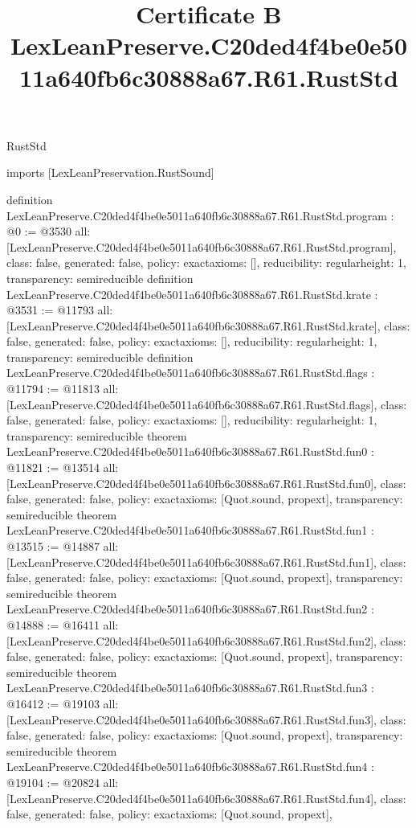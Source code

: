 \begin{lexlean}{RustStd}
\title{Certificate B LexLeanPreserve.C20ded4f4be0e5011a640fb6c30888a67.R61.RustStd}
\begin{coremodule}
imports [LexLeanPreservation.RustSound]

definition LexLeanPreserve.C20ded4f4be0e5011a640fb6c30888a67.R61.RustStd.program : @0 := @3530 {
  all: [LexLeanPreserve.C20ded4f4be0e5011a640fb6c30888a67.R61.RustStd.program],
  class: false,
  generated: false,
  policy: exact{axioms: []},
  reducibility: regular{height: 1},
  transparency: semireducible
}
definition LexLeanPreserve.C20ded4f4be0e5011a640fb6c30888a67.R61.RustStd.krate : @3531 := @11793 {
  all: [LexLeanPreserve.C20ded4f4be0e5011a640fb6c30888a67.R61.RustStd.krate],
  class: false,
  generated: false,
  policy: exact{axioms: []},
  reducibility: regular{height: 1},
  transparency: semireducible
}
definition LexLeanPreserve.C20ded4f4be0e5011a640fb6c30888a67.R61.RustStd.flags : @11794 := @11813 {
  all: [LexLeanPreserve.C20ded4f4be0e5011a640fb6c30888a67.R61.RustStd.flags],
  class: false,
  generated: false,
  policy: exact{axioms: []},
  reducibility: regular{height: 1},
  transparency: semireducible
}
theorem LexLeanPreserve.C20ded4f4be0e5011a640fb6c30888a67.R61.RustStd.fun0 : @11821 := @13514 {
  all: [LexLeanPreserve.C20ded4f4be0e5011a640fb6c30888a67.R61.RustStd.fun0],
  class: false,
  generated: false,
  policy: exact{axioms: [Quot.sound, propext]},
  transparency: semireducible
}
theorem LexLeanPreserve.C20ded4f4be0e5011a640fb6c30888a67.R61.RustStd.fun1 : @13515 := @14887 {
  all: [LexLeanPreserve.C20ded4f4be0e5011a640fb6c30888a67.R61.RustStd.fun1],
  class: false,
  generated: false,
  policy: exact{axioms: [Quot.sound, propext]},
  transparency: semireducible
}
theorem LexLeanPreserve.C20ded4f4be0e5011a640fb6c30888a67.R61.RustStd.fun2 : @14888 := @16411 {
  all: [LexLeanPreserve.C20ded4f4be0e5011a640fb6c30888a67.R61.RustStd.fun2],
  class: false,
  generated: false,
  policy: exact{axioms: [Quot.sound, propext]},
  transparency: semireducible
}
theorem LexLeanPreserve.C20ded4f4be0e5011a640fb6c30888a67.R61.RustStd.fun3 : @16412 := @19103 {
  all: [LexLeanPreserve.C20ded4f4be0e5011a640fb6c30888a67.R61.RustStd.fun3],
  class: false,
  generated: false,
  policy: exact{axioms: [Quot.sound, propext]},
  transparency: semireducible
}
theorem LexLeanPreserve.C20ded4f4be0e5011a640fb6c30888a67.R61.RustStd.fun4 : @19104 := @20824 {
  all: [LexLeanPreserve.C20ded4f4be0e5011a640fb6c30888a67.R61.RustStd.fun4],
  class: false,
  generated: false,
  policy: exact{axioms: [Quot.sound, propext]},
}
\end{coremodule}
\end{lexlean}
